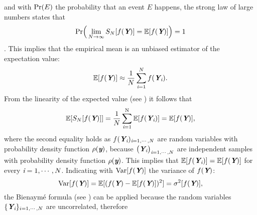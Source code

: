and with $\textrm{Pr}(E)$ the probability that an event $E$ happens,
the strong law of large numbers states that
\begin{equation}
\textrm{Pr}\Big(\lim_{N\rightarrow\infty}S_{N}[f(\textit{\textbf{Y}})] = \mathbb{E}[f(\textit{\textbf{Y}})] \Big) = 1
\end{equation}
\cite{grinstead2012introduction}. This implies that the empirical mean is an unbiased estimator of the expectation value:
\begin{equation}\label{eq:approx_MC_QMC}
\mathbb{E}[f(\textit{\textbf{Y}})] \approx \frac{1}{N} \sum_{\textit{i}=1}^{N} f(\textit{\textbf{Y}}_{\textit{i}}).
\end{equation}
From the linearity of the expected value (see \cite{grinstead2012introduction})
 it follows that
\begin{equation}\label{eq:linearity}
\mathbb{E}[S_{N}[f(\textit{\textbf{Y}})]] = \frac{1}{N}\sum_{\textit{i}=1}^{\textrm{N}}\mathbb{E}[f(\textit{\textbf{Y}}_{\textit{i}})] = \mathbb{E}[f(\textit{\textbf{Y}})],
\end{equation}
where the second equality holds as
$f(\textit{\textbf{Y}}_{\textit{i}})_{\textit{i}=1, \cdots, N}$ are random variables with probability density function $\rho(\textit{\textbf{y}})$, because $\big(\textit{\textbf{Y}}_{\textit{i}}\big)_{\textit{i}=1, \cdots, N}$ are independent samples with probability density function $\rho(\textit{\textbf{y}})$. This implies that $\mathbb{E}[f(\textit{\textbf{Y}}_{\textit{i}})] = \mathbb{E}[f(\textit{\textbf{Y}})]$ for every $\textit{i}=1, \cdots, N$. Indicating with $\textrm{Var}[f(\textit{\textbf{Y}})]$ the variance of $f(\textit{\textbf{Y}})$:
\begin{equation}\textrm{Var}[f(\textit{\textbf{Y}})]=\mathbb{E}[(f(\textit{\textbf{Y}})-\mathbb{E}[f(\textit{\textbf{Y}})])^2] = \sigma^2[f(\textit{\textbf{Y}})],
\end{equation}
the Bienaym\'e formula (see \cite{grinstead2012introduction}) can be applied because the random variables $\{\textit{\textbf{Y}}_{\textit{i}}\}_{i = 1, \cdots, N}$ are uncorrelated, therefore
